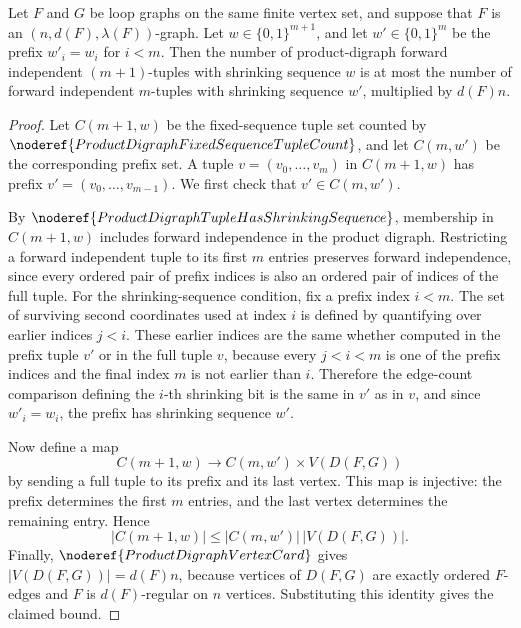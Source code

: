\begin{helper}
Let \(F\) and \(G\) be loop graphs on the same finite vertex set, and suppose that \(F\) is an \((n,d(F),\lambda(F))\)-graph. Let \(w\in\{0,1\}^{m+1}\), and let \(w'\in\{0,1\}^m\) be the prefix \(w'_i=w_i\) for \(i<m\). Then the number of product-digraph forward independent \((m+1)\)-tuples with shrinking sequence \(w\) is at most the number of forward independent \(m\)-tuples with shrinking sequence \(w'\), multiplied by \(d(F)n\).
\end{helper}
\begin{proof}
Let \(C(m+1,w)\) be the fixed-sequence tuple set counted by \(\noderef{ProductDigraphFixedSequenceTupleCount}\), and let \(C(m,w')\) be the corresponding prefix set. A tuple \(v=(v_0,\ldots,v_m)\) in \(C(m+1,w)\) has prefix \(v'=(v_0,\ldots,v_{m-1})\). We first check that \(v'\in C(m,w')\).

By \(\noderef{ProductDigraphTupleHasShrinkingSequence}\), membership in \(C(m+1,w)\) includes forward independence in the product digraph. Restricting a forward independent tuple to its first \(m\) entries preserves forward independence, since every ordered pair of prefix indices is also an ordered pair of indices of the full tuple. For the shrinking-sequence condition, fix a prefix index \(i<m\). The set of surviving second coordinates used at index \(i\) is defined by quantifying over earlier indices \(j<i\). These earlier indices are the same whether computed in the prefix tuple \(v'\) or in the full tuple \(v\), because every \(j<i<m\) is one of the prefix indices and the final index \(m\) is not earlier than \(i\). Therefore the edge-count comparison defining the \(i\)-th shrinking bit is the same in \(v'\) as in \(v\), and since \(w'_i=w_i\), the prefix has shrinking sequence \(w'\).

Now define a map
\[
  C(m+1,w)\longrightarrow C(m,w')\times V(D(F,G))
\]
by sending a full tuple to its prefix and its last vertex. This map is injective: the prefix determines the first \(m\) entries, and the last vertex determines the remaining entry. Hence
\[
  |C(m+1,w)|\le |C(m,w')|\,|V(D(F,G))|.
\]
Finally, \(\noderef{ProductDigraphVertexCard}\) gives \(|V(D(F,G))|=d(F)n\), because vertices of \(D(F,G)\) are exactly ordered \(F\)-edges and \(F\) is \(d(F)\)-regular on \(n\) vertices. Substituting this identity gives the claimed bound.
\end{proof}
